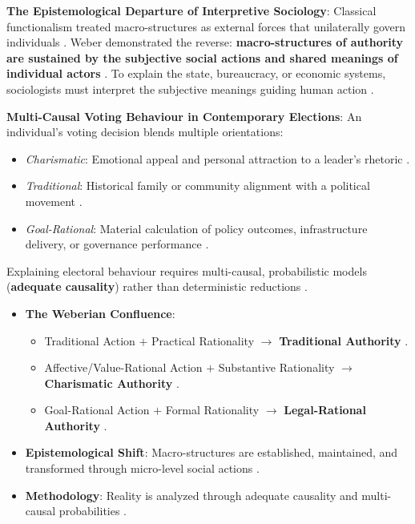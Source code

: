 \begin{CriticalPoint}
\textbf{The Epistemological Departure of Interpretive Sociology}:
Classical functionalism treated macro-structures as external forces that unilaterally govern individuals . Weber demonstrated the reverse: \textbf{macro-structures of authority are sustained by the subjective social actions and shared meanings of individual actors} . To explain the state, bureaucracy, or economic systems, sociologists must interpret the subjective meanings guiding human action .
\end{CriticalPoint}

\begin{ExampleBox}
\textbf{Multi-Causal Voting Behaviour in Contemporary Elections}:
An individual's voting decision blends multiple orientations:
\begin{itemize}
    \item \textit{Charismatic}: Emotional appeal and personal attraction to a leader's rhetoric .
    \item \textit{Traditional}: Historical family or community alignment with a political movement .
    \item \textit{Goal-Rational}: Material calculation of policy outcomes, infrastructure delivery, or governance performance .
\end{itemize}
Explaining electoral behaviour requires multi-causal, probabilistic models (\textbf{adequate causality}) rather than deterministic reductions .
\end{ExampleBox}

\begin{QuickRevision}
\begin{itemize}
    \item \textbf{The Weberian Confluence}:
    \begin{itemize}
        \item Traditional Action $+$ Practical Rationality $\rightarrow$ \textbf{Traditional Authority} .
        \item Affective/Value-Rational Action $+$ Substantive Rationality $\rightarrow$ \textbf{Charismatic Authority} .
        \item Goal-Rational Action $+$ Formal Rationality $\rightarrow$ \textbf{Legal-Rational Authority} .
    \end{itemize}
    \item \textbf{Epistemological Shift}: Macro-structures are established, maintained, and transformed through micro-level social actions .
    \item \textbf{Methodology}: Reality is analyzed through adequate causality and multi-causal probabilities .
\end{itemize}
\end{QuickRevision}

